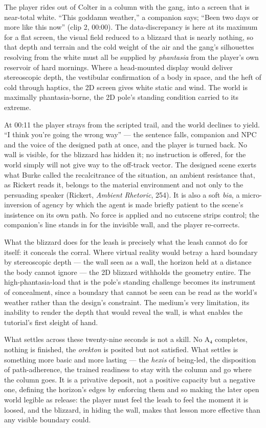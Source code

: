 \documentclass{article}
\begin{document}
The player rides out of Colter in a column with the gang, into a screen that is near-total white. ``This goddamn weather,'' a companion says; ``Been two days or more like this now'' (clip 2, 00:00). The data-discrepancy is here at its maximum for a flat screen, the visual field reduced to a blizzard that is nearly nothing, so that depth and terrain and the cold weight of the air and the gang's silhouettes resolving from the white must all be supplied by \textit{phantasia} from the player's own reservoir of hard mornings. Where a head-mounted display would deliver stereoscopic depth, the vestibular confirmation of a body in space, and the heft of cold through haptics, the 2D screen gives white static and wind. The world is maximally phantasia-borne, the 2D pole's standing condition carried to its extreme.

At 00:11 the player strays from the scripted trail, and the world declines to yield. ``I think you're going the wrong way'' — the sentence falls, companion and NPC and the voice of the designed path at once, and the player is turned back. No wall is visible, for the blizzard has hidden it; no instruction is offered, for the world simply will not give way to the off-track vector. The designed scene exerts what Burke called the recalcitrance of the situation, an ambient resistance that, as Rickert reads it, belongs to the material environment and not only to the persuading speaker (Rickert, \textit{Ambient Rhetoric}, 254). It is also a soft \textit{bia}, a micro-inversion of agency by which the agent is made briefly patient to the scene's insistence on its own path. No force is applied and no cutscene strips control; the companion's line stands in for the invisible wall, and the player re-corrects.

What the blizzard does for the leash is precisely what the leash cannot do for itself: it conceals the corral. Where virtual reality would betray a hard boundary by stereoscopic depth — the wall seen as a wall, the horizon held at a distance the body cannot ignore — the 2D blizzard withholds the geometry entire. The high-phantasia-load that is the pole's standing challenge becomes its instrument of concealment, since a boundary that cannot be seen can be read as the world's weather rather than the design's constraint. The medium's very limitation, its inability to render the depth that would reveal the wall, is what enables the tutorial's first sleight of hand.

What settles across these twenty-nine seconds is not a skill. No A₄ completes, nothing is finished, the \textit{orekton} is posited but not satisfied. What settles is something more basic and more lasting — the \textit{hexis} of being-led, the disposition of path-adherence, the trained readiness to stay with the column and go where the column goes. It is a privative deposit, not a positive capacity but a negative one, defining the horizon's edges by enforcing them and so making the later open world legible as release: the player must feel the leash to feel the moment it is loosed, and the blizzard, in hiding the wall, makes that lesson more effective than any visible boundary could.
\end{document}
